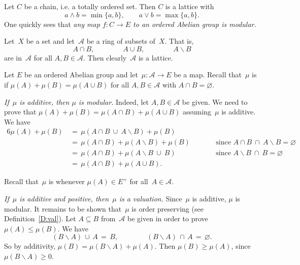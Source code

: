 \documentclass[main.tex]{subfiles}
\begin{document}
%
%
\begin{ex}
Let $C$ be a chain,
i.e. a totally ordered set.
Then $C$ is a lattice with
\begin{equation*}
a\wedge b = \min\{a,b\},
 \qquad 
a\vee b = \max\{a,b\}.
\end{equation*}
One quickly sees that
\emph{any map $f\colon C\rightarrow E$
to an ordered Abelian group is modular.}
\end{ex}

%
%
\begin{ex}
\label{E:ring-val}
Let~$X$ be a set and let~$\mathcal{A}$ be a ring of subsets of~$X$.
That is,
\begin{equation*}
A\cap B,\qquad\qquad A\cup B,\qquad\qquad A\backslash B
\end{equation*}
are in~$\mathcal{A}$ for all $A,B\in\mathcal{A}$.
Then clearly~$\mathcal{A}$ is a lattice.

Let $E$ be an ordered Abelian group
and let~$\mu\colon \mathcal{A}\rightarrow E$ be a map.
Recall that~$\mu$ is  if $\mu(A) + \mu(B) = \mu(A\cup B)$
for all $A,B\in\mathcal{A}$ with $A\cap B=\varnothing$.

\emph{If~$\mu$ is additive,
then $\mu$ is modular.}
Indeed,
let $A,B\in \mathcal{A}$ be given. We need to prove that
$\mu(A) + \mu(B) =\mu(A\cap B) + \mu(A\cup B)$
assuming~$\mu$ is additive.
We have
\begin{alignat*}{6}
\mu(A) + \mu(B) \,
  & =\, \mu(A\cap B \ \cup\ A\backslash B) + \mu(B) \\ 
  & =\, \mu(A\cap B) + \mu(A\backslash B)  + \mu(B)\qquad
    && \text{since } A\cap B \ \cap\ A\backslash B = \varnothing \\ 
  & =\, \mu(A\cap B) + \mu(A\backslash B \ \cup\ B ) 
    && \text{since } A\backslash B\ \cap\ B = \varnothing \\
  & =\, \mu(A\cap B) + \mu(A\cup B).
\end{alignat*}

Recall that~$\mu$ is  whenever
$\mu(A)\in E^+$ for all~$A\in\mathcal{A}$.

\emph{If~$\mu$ is additive and positive,
then~$\mu$ is a valuation.}
Since~$\mu$ is additive,
$\mu$ is modular.
It remains to be shown that~$\mu$ is order preserving
(see Definition~\ref{D:val}).
Let $A\subseteq B$ from~$\mathcal{A}$ be given
in order to prove $\mu(A)\leq \mu(B)$.
We have
\begin{equation*}
(B\backslash A)\,\cup\, A\,=\,B,\qquad\qquad 
(B\backslash A)\,\cap\, A\,=\,\varnothing.
\end{equation*}
So by additivity, 
$\mu(B)=\mu(B\backslash A)+\mu(A)$.
Then $\mu(B)\geq \mu(A)$, since $\mu(B\backslash A)\geq 0$.
\end{ex}
\end{document}
